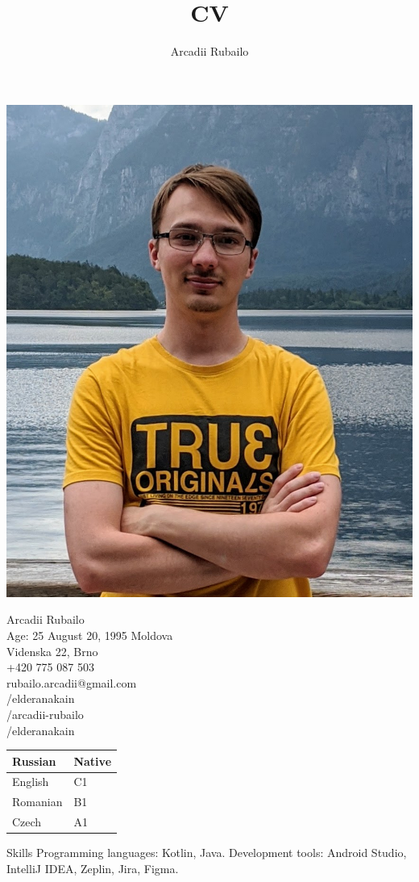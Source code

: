 \documentclass[12pt, a4paper]{article}
\title{CV}
\author{Arcadii Rubailo}
\begin{document}
\begin{minipage}{0.3\textwidth}
    \centering
    
    \includegraphics[width=\textwidth]{profile}
    
    Arcadii Rubailo \\
    Age: 25 August 20, 1995
    Moldova \\
    Videnska 22, Brno \\
    +420 775 087 503 \\
    rubailo.arcadii@gmail.com \\
    /elderanakain \\
    /arcadii-rubailo \\
    /elderanakain
    
    \renewcommand{\arraystretch}{1.5}
    \begin{center}
        \begin{tabular}{ l l }
            Russian & Native \\ \hline
            English & C1 \\ \hline
            Romanian & B1 \\ \hline
            Czech & A1 \\ \hline
        \end{tabular}
    \end{center}
    
    Skills
    Programming languages:
    Kotlin, Java.
    Development tools:
    Android Studio, IntelliJ IDEA,
    Zeplin, Jira, Figma.

\end{minipage}
\end{document}
